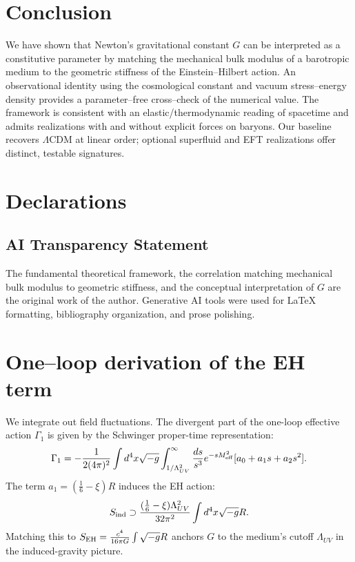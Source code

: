 \documentclass[11pt,a4paper]{article}
\begin{document}
\section{Conclusion}
We have shown that Newton's gravitational constant $G$ can be interpreted as a constitutive parameter by matching the mechanical bulk modulus of a barotropic medium to the geometric stiffness of the Einstein--Hilbert action. An observational identity using the cosmological constant and vacuum stress--energy density provides a parameter--free cross--check of the numerical value. The framework is consistent with an elastic/thermodynamic reading of spacetime and admits realizations with and without explicit forces on baryons. Our baseline recovers $\Lambda$CDM at linear order; optional superfluid and EFT realizations offer distinct, testable signatures.

\section*{Declarations}
\subsection*{AI Transparency Statement}
The fundamental theoretical framework, the correlation matching mechanical bulk modulus to geometric stiffness, and the conceptual interpretation of $G$ are the original work of the author. Generative AI tools were used for LaTeX formatting, bibliography organization, and prose polishing.

\appendix

\section{One--loop derivation of the EH term}
\label{app:one-loop}
We integrate out field fluctuations. The divergent part of the one-loop effective action $\Gamma_{1}$ is given by the Schwinger proper-time representation:\cite{Vassilevich03,Schwinger1951}
\begin{equation}
\Gamma_{1} = -\frac{1}{2(4\pi)^2} \int d^4x \sqrt{-g} \int_{1/\Lambda_{UV}^2}^\infty \frac{ds}{s^3} e^{-sM_{\rm eff}^2} [a_0 + a_1 s + a_2 s^2].
\end{equation}
The term $a_1 = (\tfrac{1}{6}-\xi)R$ induces the EH action:
\begin{equation}
S_{\rm ind} \supset \frac{(\tfrac{1}{6}-\xi)\Lambda_{UV}^2}{32\pi^2} \int d^4x \sqrt{-g} R.
\end{equation}
Matching this to $S_{\rm EH} = \frac{c^4}{16\pi G} \int \sqrt{-g} R$ anchors $G$ to the medium's cutoff $\Lambda_{UV}$ in the induced-gravity picture.
\end{document}
